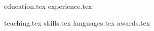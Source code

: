 \documentclass[letterpaper,11pt]{article}
\begin{document}


{education.tex}
{experience.tex}


{teaching.tex}
\sidebyside
    {{skills.tex}}
    {{languages.tex}}
{awards.tex}
\end{document}
